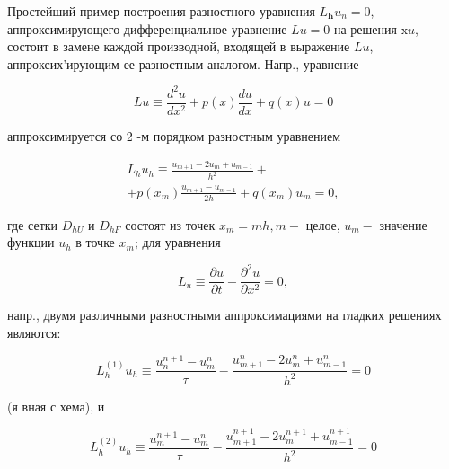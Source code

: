 \documentclass[10pt]{article}
\begin{document}
Простейший пример построения разностного уравнения $L_{\boldsymbol{h}} u_{n}=0$, аппроксимирующего дифференциальное уравнение $L u=0$ на решения $\mathrm{x} u$, состоит в замене каждой производной, входящей в выражение $L u$, аппроксих'ирующим ее разностным аналогом. Напр., уравнение



\[

L u \equiv \frac{d^{2} u}{d x^{2}}+p(x) \frac{d u}{d x}+q(x) u=0

\]



аппроксимируется со 2 -м порядком разностным уравнением



\[

\begin{gathered}

L_{h} u_{h} \equiv \frac{u_{m+1}-2 u_{m}+u_{m-1}}{h^{2}}+ \\

+p\left(x_{m}\right) \frac{u_{m+1}-u_{m-1}}{2 h}+q\left(x_{m}\right) u_{m}=0,

\end{gathered}

\]



где сетки $D_{h U}$ и $D_{h F}$ состоят из точек $x_{m}=m h, m-$ целое, $u_{m}-$ значение функции $u_{h}$ в точке $x_{m}$; для уравнения



\[

L_{u} \equiv \frac{\partial u}{\partial t}-\frac{\partial^{2} u}{\partial x^{2}}=0,

\]



напр., двумя различными разностными аппроксимациями на гладких решениях являются:



\[

L_{h}^{(1)} u_{h} \equiv \frac{u_{n}^{n+1}-u_{m}^{n}}{\tau}-\frac{u_{m+1}^{n}-2 u_{m}^{n}+u_{m-1}^{n}}{h^{2}}=0

\]



(я вная с хема), и



\[

L_{h}^{(2)} u_{h} \equiv \frac{u_{m}^{n+1}-u_{m}^{n}}{\tau}-\frac{u_{m+1}^{n+1}-2 u_{m}^{n+1}+u_{m-1}^{n+1}}{h^{2}}=0

\]
\end{document}
